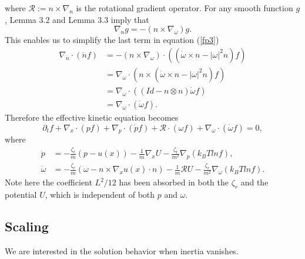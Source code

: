 \documentclass[reqno]{amsart}
\numberwithin{equation}{section}
\theoremstyle{definition}
\theoremstyle{remark}
\begin{document}
where $\mathcal{R}:=n\times \nabla_n$ is the rotational gradient
operator. For any smooth function $g$, Lemma 3.2 and Lemma 3.3 imply
that
$$
\nabla_{\dot n}g=-(n\times \nabla_\omega) g.
$$
This enables us to simplify the last term in equation (\ref{fp3})
\begin{align*}
\nabla_{\dot n} \cdot (\ddot n f)& =-(n\times \nabla_\omega)\cdot ((\dot \omega
\times n -|\omega|^2 n)f)\\
&=\nabla_\omega \cdot (n\times (\dot \omega \times n
-|\omega|^2n)f)\\
&=\nabla_\omega\cdot((Id-n\otimes n)\dot \omega f)\\
&=\nabla_\omega\cdot(\dot \omega f).
\end{align*}
Therefore the effective kinetic equation becomes
\begin{equation}\label{ke}
\partial_t f+\nabla_x \cdot (pf) +\nabla_p \cdot (\dot p f)+\mathcal{R} \cdot (\omega f)
+\nabla_{\omega} \cdot (\dot \omega f)=0,
\end{equation}
where
\begin{align*}
\dot p & =-\frac{\zeta_t}{m}(p-u(x))-\frac{1}{m}\nabla_x
U-\frac{\zeta_t}{m^2}\nabla_p (k_BT ln f),\\
 \dot \omega &= -\frac{\zeta_r}{m} (\omega -n\times \nabla_x u(x) \cdot
n) -\frac{1}{m} \mathcal{R }U -\frac{\zeta_r}{m^2}\nabla_\omega(k_BT
ln f).
\end{align*}
Note here the coefficient $L^2/12$ has been absorbed in both the
$\zeta_r$ and the potential $U$, which is independent of both  $p$
and $\omega$.

\subsection{Scaling} We are interested in the solution behavior
when inertia vanishes.
\end{document}

